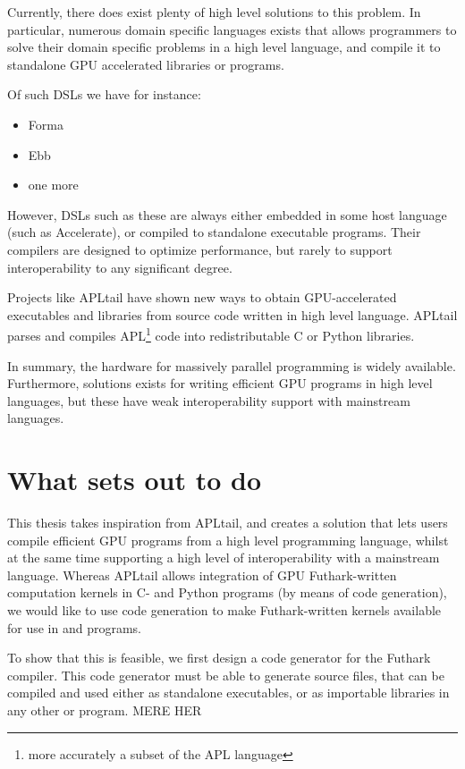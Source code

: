 Currently, there does exist plenty of high level solutions to this problem.
In particular, numerous domain specific languages exists that allows programmers
to solve their domain specific problems in a high level language, and compile it
to standalone GPU accelerated libraries or programs.

Of such DSLs we have for instance:
\begin{itemize}
\item Forma
\item Ebb
\item one more
\end{itemize}

However, DSLs such as these are always either embedded in some host language
(such as Accelerate), or compiled to standalone executable programs. Their
compilers are designed to optimize performance, but rarely to support
interoperability to any significant degree.

Projects like APLtail\cite{apltail} have shown new ways to obtain GPU-accelerated
executables and libraries from source code written in  high level language. APLtail parses
and compiles APL\footnote{more accurately a subset of the APL language} code into redistributable C or Python libraries.

In summary, the hardware for massively parallel programming is widely available.
Furthermore, solutions exists for writing efficient GPU programs in high level
languages, but these have weak interoperability support with mainstream
languages.

\section{What \fshark{} sets out to do}
This thesis takes inspiration from APLtail\cite{apltail}, and creates a solution
that lets users compile efficient GPU programs from a high level programming
language, whilst at the same time supporting a high level of interoperability
with a mainstream language.
Whereas APLtail allows integration of GPU Futhark-written computation kernels in
C- and Python programs (by means of code generation), we would like to use code generation to make Futhark-written kernels available for use in \csharp{} and \fsharp{} programs.

To show that this is feasible, we first design a \csharp{} code generator for the
Futhark compiler. This code generator must be able to generate \csharp{} source
files, that can be compiled and used either as standalone executables, or as
importable libraries in any other \csharp{} or \fsharp{} program.
MERE HER

